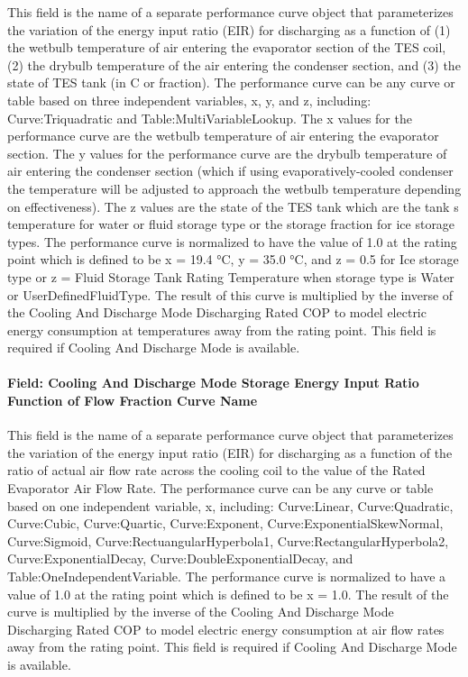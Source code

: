 This field is the name of a separate performance curve object that parameterizes the variation of the energy input ratio (EIR) for discharging as a function of (1) the wetbulb temperature of air entering the evaporator section of the TES coil, (2) the drybulb temperature of the air entering the condenser section, and (3) the state of TES tank (in C or fraction). The performance curve can be any curve or table based on three independent variables, x, y, and z, including: Curve:Triquadratic and Table:MultiVariableLookup. The x values for the performance curve are the wetbulb temperature of air entering the evaporator section. The y values for the performance curve are the drybulb temperature of air entering the condenser section (which if using evaporatively-cooled condenser the temperature will be adjusted to approach the wetbulb temperature depending on effectiveness). The z values are the state of the TES tank which are the tank s temperature for water or fluid storage type or the storage fraction for ice storage types. The performance curve is normalized to have the value of 1.0 at the rating point which is defined to be x = 19.4 °C, y = 35.0 °C, and z = 0.5 for Ice storage type or z = Fluid Storage Tank Rating Temperature when storage type is Water or UserDefinedFluidType. The result of this curve is multiplied by the inverse of the Cooling And Discharge Mode Discharging Rated COP to model electric energy consumption at temperatures away from the rating point. This field is required if Cooling And Discharge Mode is available.

\paragraph{Field: Cooling And Discharge Mode Storage Energy Input Ratio Function of Flow Fraction Curve Name}\label{field-cooling-and-discharge-mode-storage-energy-input-ratio-function-of-flow-fraction-curve-name}

This field is the name of a separate performance curve object that parameterizes the variation of the energy input ratio (EIR) for discharging as a function of the ratio of actual air flow rate across the cooling coil to the value of the Rated Evaporator Air Flow Rate. The performance curve can be any curve or table based on one independent variable, x, including: Curve:Linear, Curve:Quadratic, Curve:Cubic, Curve:Quartic, Curve:Exponent, Curve:ExponentialSkewNormal, Curve:Sigmoid, Curve:RectuangularHyperbola1, Curve:RectangularHyperbola2, Curve:ExponentialDecay, Curve:DoubleExponentialDecay, and Table:OneIndependentVariable. The performance curve is normalized to have a value of 1.0 at the rating point which is defined to be x = 1.0. The result of the curve is multiplied by the inverse of the Cooling And Discharge Mode Discharging Rated COP to model electric energy consumption at air flow rates away from the rating point. This field is required if Cooling And Discharge Mode is available.

